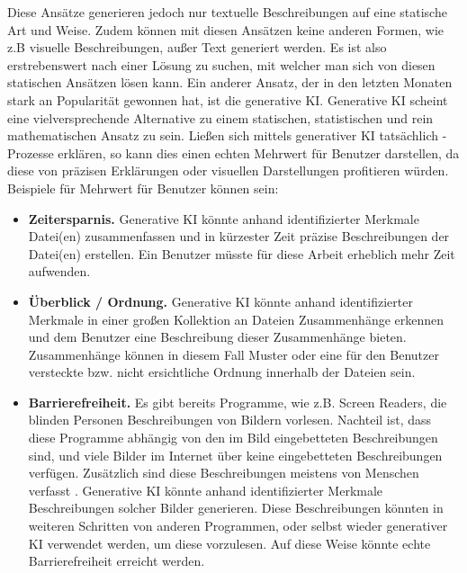 Diese Ansätze generieren jedoch nur textuelle Beschreibungen auf eine statische Art und Weise.
Zudem können mit diesen Ansätzen keine anderen Formen, wie z.B visuelle Beschreibungen, außer Text generiert werden.
Es ist also erstrebenswert nach einer Lösung zu suchen, mit welcher man sich von diesen statischen Ansätzen lösen kann.
Ein anderer Ansatz, der in den letzten Monaten stark an Popularität gewonnen hat, ist die generative KI.
Generative KI scheint eine vielversprechende Alternative zu einem statischen, statistischen und rein mathematischen Ansatz zu sein.
\newline
Ließen sich mittels generativer KI tatsächlich \mmir{}-Prozesse erklären, so kann dies einen echten Mehrwert für Benutzer darstellen, da diese von präzisen Erklärungen oder visuellen Darstellungen profitieren würden.
Beispiele für Mehrwert für Benutzer können sein:
\begin{itemize}
    \item \textbf{Zeitersparnis.} Generative KI könnte anhand identifizierter Merkmale Datei(en) zusammenfassen und in kürzester Zeit präzise Beschreibungen der Datei(en) erstellen.
    Ein Benutzer müsste für diese Arbeit erheblich mehr Zeit aufwenden.
    \item \textbf{Überblick / Ordnung.} Generative KI könnte anhand identifizierter Merkmale in einer großen Kollektion an Dateien Zusammenhänge erkennen und dem Benutzer eine Beschreibung dieser Zusammenhänge bieten.
    Zusammenhänge können in diesem Fall Muster oder eine für den Benutzer versteckte bzw. nicht ersichtliche Ordnung innerhalb der Dateien sein.
    \item \textbf{Barrierefreiheit.} Es gibt bereits Programme, wie z.B. Screen Readers, die blinden Personen Beschreibungen von Bildern vorlesen.
    Nachteil ist, dass diese Programme abhängig von den im Bild eingebetteten Beschreibungen sind, und viele Bilder im Internet über keine eingebetteten Beschreibungen verfügen.
    Zusätzlich sind diese Beschreibungen meistens von Menschen verfasst \cite{google-ai-accessability}.
    \newline
    Generative KI könnte anhand identifizierter Merkmale Beschreibungen solcher Bilder generieren.
    Diese Beschreibungen könnten in weiteren Schritten von anderen Programmen, oder selbst wieder generativer KI verwendet werden, um diese vorzulesen.
    Auf diese Weise könnte echte Barrierefreiheit erreicht werden.
\end{itemize}

\FloatBarrier

